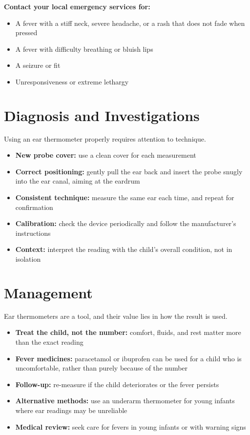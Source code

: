 \textbf{Contact your local emergency services for:}
\begin{itemize}
    \item A fever with a stiff neck, severe headache, or a rash that does not fade when pressed
    \item A fever with difficulty breathing or bluish lips
    \item A seizure or fit
    \item Unresponsiveness or extreme lethargy
\end{itemize}

\section*{Diagnosis and Investigations}
Using an ear thermometer properly requires attention to technique.
\begin{itemize}
    \item \textbf{New probe cover:} use a clean cover for each measurement
    \item \textbf{Correct positioning:} gently pull the ear back and insert the probe snugly into the ear canal, aiming at the eardrum
    \item \textbf{Consistent technique:} measure the same ear each time, and repeat for confirmation
    \item \textbf{Calibration:} check the device periodically and follow the manufacturer's instructions
    \item \textbf{Context:} interpret the reading with the child's overall condition, not in isolation
\end{itemize}

\section*{Management}
Ear thermometers are a tool, and their value lies in how the result is used.
\begin{itemize}
    \item \textbf{Treat the child, not the number:} comfort, fluids, and rest matter more than the exact reading
    \item \textbf{Fever medicines:} paracetamol or ibuprofen can be used for a child who is uncomfortable, rather than purely because of the number
    \item \textbf{Follow-up:} re-measure if the child deteriorates or the fever persists
    \item \textbf{Alternative methods:} use an underarm thermometer for young infants where ear readings may be unreliable
    \item \textbf{Medical review:} seek care for fevers in young infants or with warning signs
\end{itemize}

